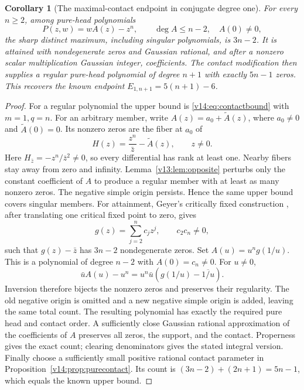 \documentclass[UTF8,11pt]{ctexart}
\newtheorem{cor}[thm]{Corollary}
\theoremstyle{definition}
\numberwithin{equation}{section}
\begin{document}
\begin{cor}[The maximal-contact endpoint in conjugate degree one]
\label{v14:cor:sharpcontact}
For every $n\ge2$, among pure-head polynomials
\[
 P(z,w)=wA(z)-z^n,\qquad \deg A\le n-2,\quad A(0)\ne0,
\]
the sharp distinct maximum, including singular polynomials, is
$3n-2$. It is attained with nondegenerate zeros and Gaussian
rational, and after a
nonzero scalar multiplication Gaussian integer, coefficients.
The contact modification then supplies a regular pure-head
polynomial of degree $n+1$ with exactly $5n-1$ zeros.
This recovers the known endpoint $E_{1,n+1}=5(n+1)-6$.
\end{cor}
\begin{proof}
For a regular polynomial the upper bound is
\eqref{v14:eq:contactbound} with $m=1,q=n$.
For an arbitrary member, write $A(z)=a_0+\widetilde A(z)$,
where $a_0\ne0$ and $\widetilde A(0)=0$. Its nonzero zeros
are the fiber at $a_0$ of
\[
 H(z)=\frac{z^n}{\bar z}-\widetilde A(z),\qquad z\ne0.
\]
Here $H_{\bar z}=-z^n/\bar z^2\ne0$, so every differential
has rank at least one. Nearby fibers stay away from zero
and infinity. Lemma~\ref{v13:lem:opposite} perturbs only the
constant coefficient of $A$ to produce a regular member with
at least as many nonzero zeros. The negative simple origin
persists. Hence the same upper bound covers singular members.
For attainment, Geyer's critically fixed construction
\cite[Theorem~1 and proof of Corollary~2, author version,
pp.~1, 3--4]{Gey08}, after translating one critical fixed point
to zero, gives
\[
 g(z)=\sum_{j=2}^n c_jz^j,\qquad c_2c_n\ne0,
\]
such that $g(z)-\bar z$ has $3n-2$ nondegenerate zeros.
Set $A(u)=u^ng(1/u)$. This is a polynomial of degree $n-2$
with $A(0)=c_n\ne0$. For $u\ne0$,
\[
 \bar u A(u)-u^n
 =u^n\bar u\left(g(1/u)-\overline{1/u}\right).
\]
Inversion therefore bijects the nonzero zeros and preserves
their regularity. The old negative origin is omitted and a new
negative simple origin is added, leaving the same total count.
The resulting polynomial has exactly the required pure head
and contact order. A sufficiently close Gaussian rational
approximation of the coefficients of $A$ preserves all zeros,
the support, and the contact. Properness gives the exact count;
clearing denominators gives the stated integral version.
Finally choose a sufficiently small positive rational contact
parameter in Proposition~\ref{v14:prop:purecontact}. Its count
is $(3n-2)+(2n+1)=5n-1$, which equals the known upper bound.
\end{proof}
\end{document}
